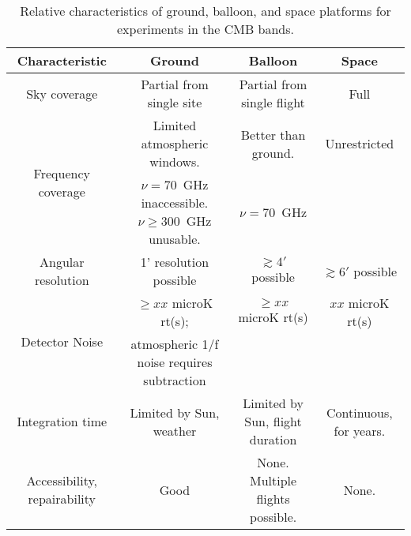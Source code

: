\documentclass[PICOReport.tex]{subfiles}
\begin{document}
\begin{table}%
\begin{adjustbox}{width=1\textwidth,center}
\begin{tabular}{|c|c|c|c|}
\hline
\bf{Characteristic} & {\bf Ground} & {\bf Balloon} & {\bf Space}  \\ \hline
Sky coverage & Partial from single site & Partial from single flight & Full \\ \hline
\multirow{2}{*}{Frequency coverage} & Limited atmospheric windows.  & Better than ground.  &  Unrestricted \\  
                                     & $\nu=70$~GHz inaccessible. $\nu \ge 300$~GHz unusable. & $\nu=70$~GHz & \\ \hline
      Angular resolution  & 1' resolution possible & $\gtrsim 4'$ possible & $\gtrsim 6'$ possible \\ \hline
\multirow{2}{*}{Detector Noise} & $\ge xx$ microK rt(s);  & $\ge xx$ microK rt(s)  &  $ xx$ microK rt(s) \\  
                                     & atmospheric 1/f noise requires subtraction &  & \\ \hline
Integration time  & Limited by Sun, weather & Limited by Sun, flight duration & Continuous, for years.\\ \hline
Accessibility, repairability & Good & None.  Multiple flights possible.& None.\\
\hline
\end{tabular}
\end{adjustbox}
\vspace{-0.13in}
\caption{ \small \setlength{\baselineskip}{0.95\baselineskip}
Relative characteristics of ground, balloon, and space platforms for experiments in the CMB bands.
\label{tab:comparison} }
\vspace{-0.05in}
\end{table}
\end{document}
